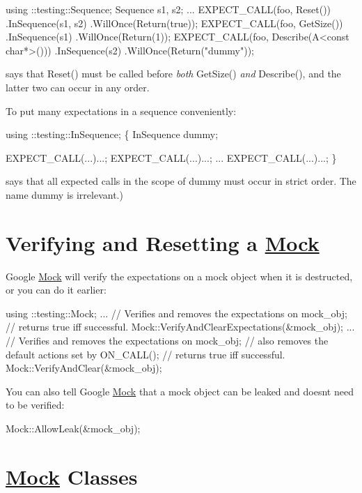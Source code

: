\begin{DoxyCode}
using ::testing::Sequence;
Sequence s1, s2;
...
EXPECT\_CALL(foo, Reset())
    .InSequence(s1, s2)
    .WillOnce(Return(true));
EXPECT\_CALL(foo, GetSize())
    .InSequence(s1)
    .WillOnce(Return(1));
EXPECT\_CALL(foo, Describe(A<const char*>()))
    .InSequence(s2)
    .WillOnce(Return("dummy"));
\end{DoxyCode}
 says that {\ttfamily Reset()} must be called before {\itshape both} {\ttfamily Get\+Size()} {\itshape and} {\ttfamily Describe()}, and the latter two can occur in any order.

To put many expectations in a sequence conveniently\+: 
\begin{DoxyCode}
using ::testing::InSequence;
\{
  InSequence dummy;

  EXPECT\_CALL(...)...;
  EXPECT\_CALL(...)...;
  ...
  EXPECT\_CALL(...)...;
\}
\end{DoxyCode}
 says that all expected calls in the scope of {\ttfamily dummy} must occur in strict order. The name {\ttfamily dummy} is irrelevant.)

\section*{Verifying and Resetting a \hyperlink{class_mock}{Mock}}

Google \hyperlink{class_mock}{Mock} will verify the expectations on a mock object when it is destructed, or you can do it earlier\+: 
\begin{DoxyCode}
using ::testing::Mock;
...
// Verifies and removes the expectations on mock\_obj;
// returns true iff successful.
Mock::VerifyAndClearExpectations(&mock\_obj);
...
// Verifies and removes the expectations on mock\_obj;
// also removes the default actions set by ON\_CALL();
// returns true iff successful.
Mock::VerifyAndClear(&mock\_obj);
\end{DoxyCode}


You can also tell Google \hyperlink{class_mock}{Mock} that a mock object can be leaked and doesn\textquotesingle{}t need to be verified\+: 
\begin{DoxyCode}
Mock::AllowLeak(&mock\_obj);
\end{DoxyCode}


\section*{\hyperlink{class_mock}{Mock} Classes}

